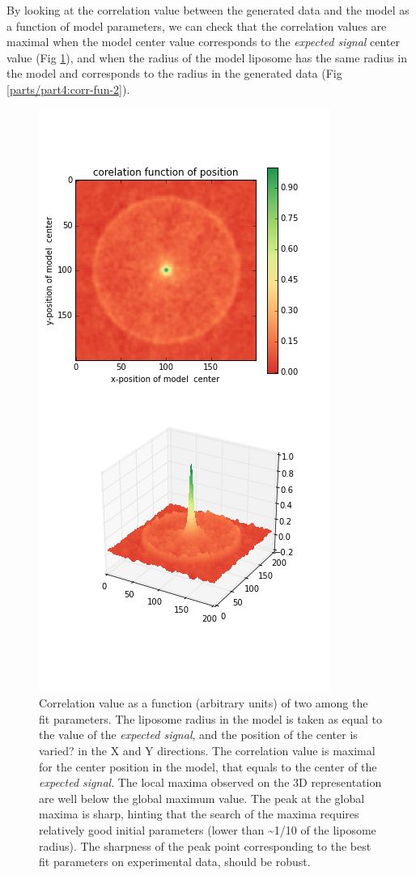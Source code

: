 \documentclass[A4paperpaper,11pt,english]{sphinxmanual}
\begin{document}
By looking at the correlation value between the generated data and the model
as a function of model parameters, we can check that the correlation
values are maximal when the model center value corresponds to the \emph{expected signal}
center value (Fig \ref{parts/part4:corr-fun-1}), and when the radius of the model liposome
has the same radius in the model and corresponds to the radius in the generated data (Fig \ref{parts/part4:corr-fun-2}).
\begin{figure}[htbp]
\centering
\capstart

\includegraphics[width=0.500\linewidth]{double-c-_100-by-100-rc-40_0-noise-0_5-delta-4_0_.png}
\caption{Correlation value as a function (arbitrary units) of two among the fit
parameters. The liposome radius in the model is taken as
equal to the value of the \emph{expected signal}, and the position of the center
is varied?  in the X and Y directions. The correlation value is maximal for
the center position in the model, that equals to the center of the
\emph{expected signal}.  The local maxima observed on the 3D representation
are well below the global maximum value.
The peak at the global maxima is sharp, hinting that
the search of the maxima requires relatively good initial
parameters (lower than \textasciitilde{}1/10 of the liposome radius). The sharpness of the peak
point corresponding to the best fit parameters on experimental data, should be
robust.}\label{parts/part4:corr-fun-1}\end{figure}
\end{document}
